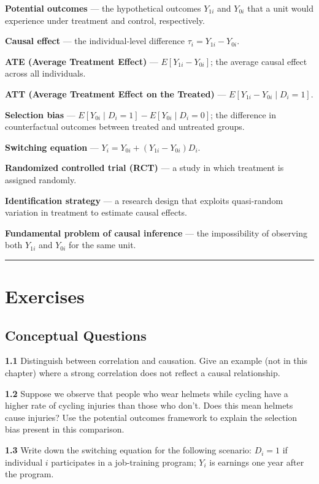 \textbf{Potential outcomes} --- the hypothetical outcomes $Y_{1i}$ and $Y_{0i}$ that a unit would experience under treatment and control, respectively.

\textbf{Causal effect} --- the individual-level difference $\tau_i = Y_{1i} - Y_{0i}$.

\textbf{ATE (Average Treatment Effect)} --- $E[Y_{1i} - Y_{0i}]$; the average causal effect across all individuals.

\textbf{ATT (Average Treatment Effect on the Treated)} --- $E[Y_{1i} - Y_{0i} \mid D_i = 1]$.

\textbf{Selection bias} --- $E[Y_{0i} \mid D_i = 1] - E[Y_{0i} \mid D_i = 0]$; the difference in counterfactual outcomes between treated and untreated groups.

\textbf{Switching equation} --- $Y_i = Y_{0i} + (Y_{1i} - Y_{0i})D_i$.

\textbf{Randomized controlled trial (RCT)} --- a study in which treatment is assigned randomly.

\textbf{Identification strategy} --- a research design that exploits quasi-random variation in treatment to estimate causal effects.

\textbf{Fundamental problem of causal inference} --- the impossibility of observing both $Y_{1i}$ and $Y_{0i}$ for the same unit.

\medskip\hrule\medskip

\section{Exercises}

\subsection{Conceptual Questions}

\textbf{1.1} Distinguish between correlation and causation. Give an example (not in this chapter) where a strong correlation does not reflect a causal relationship.

\textbf{1.2} Suppose we observe that people who wear helmets while cycling have a higher rate of cycling injuries than those who don't. Does this mean helmets cause injuries? Use the potential outcomes framework to explain the selection bias present in this comparison.

\textbf{1.3} Write down the switching equation for the following scenario: $D_i = 1$ if individual $i$ participates in a job-training program; $Y_i$ is earnings one year after the program.

